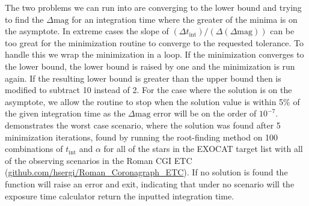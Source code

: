 The two problems we can run into are converging to the lower bound and trying
to find the $\Delta\textrm{mag}$ for an integration time where the greater of the
minima is on the asymptote. In extreme cases the slope of $(\Delta  t_{\textrm{int}}) /
\left(\Delta(\Delta\textrm{mag})\right)$ can be too great for the minimization
routine to converge to the requested tolerance. To handle this we wrap the
minimization in a loop. If the minimization converges to the lower bound, the
lower bound is raised by one and the minimization is run again. If the
resulting lower bound is greater than the upper bound then  is
modified to subtract 10 instead of 2. For the case where the solution is on the
asymptote, we allow the routine to stop when the solution value is within 5\% of
the given integration time as the $\Delta\textrm{mag}$ error will be on the
order of $10^{-7}$.  demonstrates the worst
case scenario, where the solution was found after 5 minimization iterations,
found by running the root-finding method on 100 combinations of $t_\textrm{int}$ and
$\alpha$ for all of the stars in the EXOCAT target list
\citep{turnbullExoCat1Nearby2015} with all of the observing scenarios in the
Roman CGI ETC (\url{github.com/hsergi/Roman_Coronagraph_ETC}). If no solution
is found the function will raise an error and exit, indicating that under no
scenario will the exposure time calculator return the inputted integration time.


